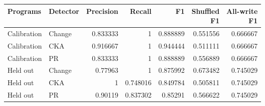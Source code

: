 \begin{center}\small
\begin{tabular}{@{}llrrrrr@{}}
\toprule
Programs & Detector & Precision & Recall & F1 & \shortstack{Shuffled\\F1} & \shortstack{All-write\\F1} \\
\midrule
Calibration & Change & 0.833333 & 1 & 0.888889 & 0.551556 & 0.666667 \\
Calibration & CKA & 0.916667 & 1 & 0.944444 & 0.511111 & 0.666667 \\
Calibration & PR & 0.833333 & 1 & 0.888889 & 0.556889 & 0.666667 \\
Held out & Change & 0.77963 & 1 & 0.875992 & 0.673482 & 0.745029 \\
Held out & CKA & 1 & 0.748016 & 0.849784 & 0.505811 & 0.745029 \\
Held out & PR & 0.90119 & 0.837302 & 0.85291 & 0.566622 & 0.745029 \\
\bottomrule
\end{tabular}
\end{center}
